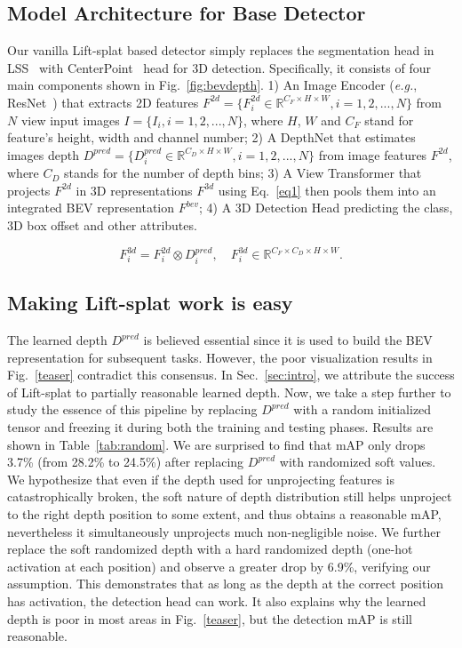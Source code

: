 \documentclass[twocolumn,letterpaper]{article}
\begin{document}
\subsection{Model Architecture for Base Detector} Our vanilla Lift-splat based detector simply replaces the segmentation head in LSS~\cite{philion2020lift} with CenterPoint~\cite{yin2021center} head for 3D detection. Specifically, it consists of four main components shown in Fig.~\ref{fig:bevdepth}. 1) An Image Encoder (\emph{e.g.}, ResNet~\cite{resnet}) that extracts 2D features $F^{2d} = \{ F_i^{2d} \in \mathbb{R}^{C_F \times H \times W}, i=1,2,...,N\}$ from $N$ view input images $I = \{I_i, i=1,2,...,N\}$, where $H$, $W$ and $C_F$ stand for feature's height, width and channel number; 2) A DepthNet that estimates images depth $D^{pred} = \{ D_i^{pred} \in \mathbb{R}^{C_D \times H \times W}, i=1,2,...,N\}$ from image features $F^{2d}$, where $C_D$ stands for the number of depth bins; 3) A View Transformer that projects $F^{2d}$ in 3D representations $F^{3d}$ using Eq.~\ref{eq1} then pools them into an integrated BEV representation $F^{bev}$; 4) A 3D Detection Head predicting the class, 3D box offset and other attributes.

\begin{equation}\label{eq1}
    F_i^{3d} = F_i^{2d} \otimes D_i^{pred}, \quad F_i^{3d} \in \mathbb{R}^{C_F \times C_D \times H  \times W}.
\end{equation}

\subsection{Making Lift-splat work is easy} 

The learned depth $D^{pred}$ is believed essential since it is used to build the BEV representation for subsequent tasks. However, the poor visualization results in Fig.~\ref{teaser} contradict this consensus. In Sec.~\ref{sec:intro}, we attribute the success of Lift-splat to partially reasonable learned depth. Now, we take a step further to study the essence of this pipeline by replacing $D^{pred}$ with a random initialized tensor and freezing it during both the training and testing phases. Results are shown in Table~\ref{tab:random}. We are surprised to find that mAP only drops 3.7\% (from 28.2\% to 24.5\%) after replacing $D^{pred}$ with randomized soft values. We hypothesize that even if the depth used for unprojecting features is catastrophically broken, the soft nature of depth distribution still helps unproject to the right depth position to some extent, and thus obtains a reasonable mAP, nevertheless it simultaneously unprojects much non-negligible
noise. We further replace the soft randomized depth with a hard randomized depth (one-hot activation at each position) and observe a greater drop by 6.9\%, verifying our assumption. This demonstrates that as long as the depth at the correct position has activation, the detection head can work. It also explains why the learned depth is poor in most areas in Fig.~\ref{teaser}, but the detection mAP is still reasonable. 
\end{document}
